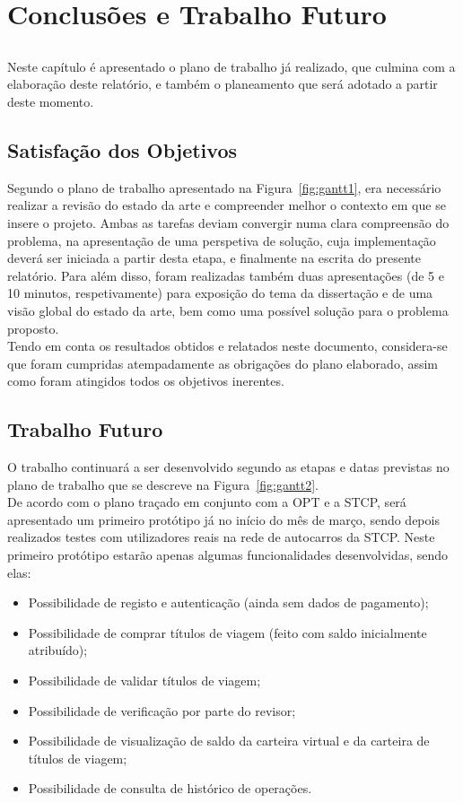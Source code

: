 \chapter{Conclusões e Trabalho Futuro} \label{chap:concl}

\section*{}

Neste capítulo é apresentado o plano de trabalho já realizado, que culmina com a elaboração deste relatório, e também o planeamento que será adotado a partir deste momento.

\section{Satisfação dos Objetivos}

Segundo o plano de trabalho apresentado na Figura~\ref{fig:gantt1}, era necessário realizar a revisão do estado da arte e compreender melhor o contexto em que se insere o projeto. Ambas as tarefas deviam convergir numa clara compreensão do problema, na apresentação de uma perspetiva de solução, cuja implementação deverá ser iniciada a partir desta etapa, e finalmente na escrita do presente relatório. Para além disso, foram realizadas também duas apresentações (de 5 e 10 minutos, respetivamente) para exposição do tema da dissertação e de uma visão global do estado da arte, bem como uma possível solução para o problema proposto.
\\Tendo em conta os resultados obtidos e relatados neste documento, considera-se que foram cumpridas atempadamente as obrigações do plano elaborado, assim como foram atingidos todos os objetivos inerentes.

\section{Trabalho Futuro}

O trabalho continuará a ser desenvolvido segundo as etapas e datas previstas no plano de trabalho que se descreve na Figura~\ref{fig:gantt2}.
\\De acordo com o plano traçado em conjunto com a OPT e a STCP, será apresentado um primeiro protótipo já no início do mês de março, sendo depois realizados testes com utilizadores reais na rede de autocarros da STCP. Neste primeiro protótipo estarão apenas algumas funcionalidades desenvolvidas, sendo elas:
\begin{itemize}
\item Possibilidade de registo e autenticação (ainda sem dados de pagamento);
\item Possibilidade de comprar títulos de viagem (feito com saldo inicialmente atribuído);
\item Possibilidade de validar títulos de viagem;
\item Possibilidade de verificação por parte do revisor;
\item Possibilidade de visualização de saldo da carteira virtual e da carteira de títulos de viagem;
\item Possibilidade de consulta de histórico de operações.
\end{itemize}

